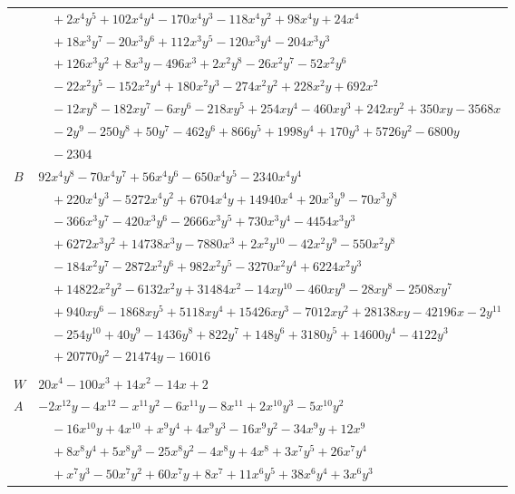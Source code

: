 \documentclass[11pt]{article}
\begin{document}
\begin{longtable}{@{}ll@{}}
 & $\quad +2x^{4}y^{5}+102x^{4}y^{4}-170x^{4}y^{3}-118x^{4}y^{2}+98x^{4}y+24x^{4}$\\
 & $\quad +18x^{3}y^{7}-20x^{3}y^{6}+112x^{3}y^{5}-120x^{3}y^{4}-204x^{3}y^{3}$\\
 & $\quad +126x^{3}y^{2}+8x^{3}y-496x^{3}+2x^{2}y^{8}-26x^{2}y^{7}-52x^{2}y^{6}$\\
 & $\quad -22x^{2}y^{5}-152x^{2}y^{4}+180x^{2}y^{3}-274x^{2}y^{2}+228x^{2}y+692x^{2}$\\
 & $\quad -12xy^{8}-182xy^{7}-6xy^{6}-218xy^{5}+254xy^{4}-460xy^{3}+242xy^{2}+350xy-3568x$\\
 & $\quad -2y^{9}-250y^{8}+50y^{7}-462y^{6}+866y^{5}+1998y^{4}+170y^{3}+5726y^{2}-6800y$\\
 & $\quad -2304$\\
$B$ & $92x^{4}y^{8}-70x^{4}y^{7}+56x^{4}y^{6}-650x^{4}y^{5}-2340x^{4}y^{4}$\\
 & $\quad +220x^{4}y^{3}-5272x^{4}y^{2}+6704x^{4}y+14940x^{4}+20x^{3}y^{9}-70x^{3}y^{8}$\\
 & $\quad -366x^{3}y^{7}-420x^{3}y^{6}-2666x^{3}y^{5}+730x^{3}y^{4}-4454x^{3}y^{3}$\\
 & $\quad +6272x^{3}y^{2}+14738x^{3}y-7880x^{3}+2x^{2}y^{10}-42x^{2}y^{9}-550x^{2}y^{8}$\\
 & $\quad -184x^{2}y^{7}-2872x^{2}y^{6}+982x^{2}y^{5}-3270x^{2}y^{4}+6224x^{2}y^{3}$\\
 & $\quad +14822x^{2}y^{2}-6132x^{2}y+31484x^{2}-14xy^{10}-460xy^{9}-28xy^{8}-2508xy^{7}$\\
 & $\quad +940xy^{6}-1868xy^{5}+5118xy^{4}+15426xy^{3}-7012xy^{2}+28138xy-42196x-2y^{11}$\\
 & $\quad -254y^{10}+40y^{9}-1436y^{8}+822y^{7}+148y^{6}+3180y^{5}+14600y^{4}-4122y^{3}$\\
 & $\quad +20770y^{2}-21474y-16016$\\
\addlinespace[3pt]
\multicolumn{2}{@{}l}{$g=2$, $i=6$, $m=1$, neighbours $5,8,9,19,20,22,23,27,30,33,38$}\\
$W$ & $20x^{4}-100x^{3}+14x^{2}-14x+2$\\
$A$ & $-2x^{12}y-4x^{12}-x^{11}y^{2}-6x^{11}y-8x^{11}+2x^{10}y^{3}-5x^{10}y^{2}$\\
 & $\quad -16x^{10}y+4x^{10}+x^{9}y^{4}+4x^{9}y^{3}-16x^{9}y^{2}-34x^{9}y+12x^{9}$\\
 & $\quad +8x^{8}y^{4}+5x^{8}y^{3}-25x^{8}y^{2}-4x^{8}y+4x^{8}+3x^{7}y^{5}+26x^{7}y^{4}$\\
 & $\quad +x^{7}y^{3}-50x^{7}y^{2}+60x^{7}y+8x^{7}+11x^{6}y^{5}+38x^{6}y^{4}+3x^{6}y^{3}$\\

\end{longtable}
\end{document}
